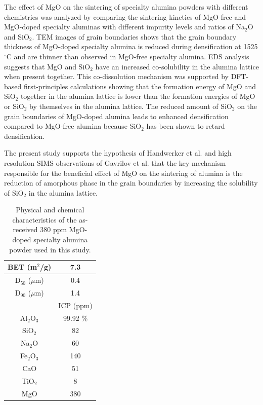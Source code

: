 The effect of MgO on the sintering of specialty alumina powders with different chemistries was analyzed by comparing the sintering kinetics of MgO-free and MgO-doped specialty aluminas with different impurity levels and ratios of Na$_{2}$O and SiO$_{2}$. TEM images of grain boundaries shows that the grain boundary thickness of MgO-doped specialty alumina is reduced during densification at 1525 $^{\circ}$C and are thinner than observed in MgO-free specialty alumina. EDS analysis suggests that MgO and SiO$_{2}$ have an increased co-solubility in the alumina lattice when present together. This co-dissolution mechanism was supported by DFT-based first-principles calculations showing that the formation energy of MgO and SiO$_{2}$ together in the alumina lattice is lower than the formation energies of MgO or SiO$_{2}$ by themselves in the alumina lattice. The reduced amount of SiO$_{2}$ on the grain boundaries of MgO-doped alumina leads to enhanced densification compared to MgO-free alumina because SiO$_{2}$ has been shown to retard densification.

The present study supports the hypothesis of Handwerker et al. \cite{Handwerker1989} and high resolution SIMS observations of Gavrilov et al. \cite{Gavrilov1999} that the key mechanism responsible for the beneficial effect of MgO on the sintering of alumina is the reduction of amorphous phase in the grain boundaries by increasing the solubility of SiO$_{2}$ in the alumina lattice.


\newpage
\begin{table}[H]
	\caption{Physical and chemical characteristics of the as-received 380 ppm MgO-doped specialty alumina powder used in this study.}
	\centering
	\begin{tabular}{ | c | c | }
			\hline
			BET (m$^{2}$/g) & 7.3 \\
			\hline
			D$_{50}$ ($\mu$m) & 0.4 \\
			\hline
			D$_{90}$ ($\mu$m) & 1.4 \\
			\hline
			 & ICP (ppm) \\
			\hline
			Al$_{2}$O$_{3}$ & 99.92 \% \\
			\hline
			SiO$_{2}$ & 82 \\
			\hline
			Na$_{2}$O & 60 \\
			\hline
			Fe$_{2}$O$_{3}$ & 140 \\
			\hline
			CaO & 51 \\
			\hline
			TiO$_{2}$ & 8 \\
			\hline
			MgO & 380 \\
			\hline
	\end{tabular}
	\label{Ch3-table:table1}
\end{table}
\clearpage

